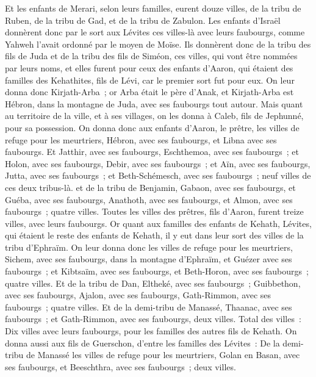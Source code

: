 \begin{multicols}{2}
Et les enfants de Merari, selon leurs familles, eurent douze villes, de la tribu de Ruben, de la tribu de Gad, et de la tribu de Zabulon.
Les enfants d'Israël donnèrent donc par le sort aux Lévites ces villes-là avec leurs faubourgs, comme Yahweh l'avait ordonné par le moyen de Moïse.
Ils donnèrent donc de la tribu des fils de Juda et de la tribu des fils de Siméon, ces villes, qui vont être nommées par leurs noms,
et elles furent pour ceux des enfants d'Aaron, qui étaient des familles des Kehathites, fils de Lévi, car le premier sort fut pour eux.
On leur donna donc Kirjath-Arba~; or Arba était le père d'Anak, et Kirjath-Arba est Hébron, dans la montagne de Juda, avec ses faubourgs tout autour.
Mais quant au territoire de la ville, et à ses villages, on les donna à Caleb, fils de Jephunné, pour sa possession.
On donna donc aux enfants d'Aaron, le prêtre, les villes de refuge pour les meurtriers, Hébron, avec ses faubourgs, et Libna avec ses faubourgs.
Et Jatthir, avec ses faubourgs, Eschthemoa, avec ses faubourgs~;
et Holon, avec ses faubourgs, Debir, avec ses faubourgs~;
et Aïn, avec ses faubourgs, Jutta, avec ses faubourgs~; et Beth-Schémesch, avec ses faubourgs~; neuf villes de ces deux tribus-là.
et de la tribu de Benjamin, Gabaon, avec ses faubourgs, et Guéba, avec ses faubourgs,
Anathoth, avec ses faubourgs, et Almon, avec ses faubourgs~; quatre villes.
Toutes les villes des prêtres, fils d'Aaron, furent treize villes, avec leurs faubourgs.
Or quant aux familles des enfants de Kehath, Lévites, qui étaient le reste des enfants de Kehath, il y eut dans leur sort des villes de la tribu d'Ephraïm.
On leur donna donc les villes de refuge pour les meurtriers, Sichem, avec ses faubourgs, dans la montagne d'Ephraïm, et Guézer avec ses faubourgs~;
et Kibtsaïm, avec ses faubourgs, et Beth-Horon, avec ses faubourgs~; quatre villes.
Et de la tribu de Dan, Eltheké, avec ses faubourgs~; Guibbethon, avec ses faubourgs,
Ajalon, avec ses faubourgs, Gath-Rimmon, avec ses faubourgs~; quatre villes.
Et de la demi-tribu de Manassé, Thaanac, avec ses faubourgs~; et Gath-Rimmon, avec ses faubourgs, deux villes.
Total des villes~: Dix villes avec leurs faubourgs, pour les familles des autres fils de Kehath.
On donna aussi aux fils de Guerschon, d'entre les familles des Lévites~: De la demi-tribu de Manassé les villes de refuge pour les meurtriers, Golan en Basan, avec ses faubourgs, et Beeschthra, avec ses faubourgs~; deux villes.

\end{multicols}
